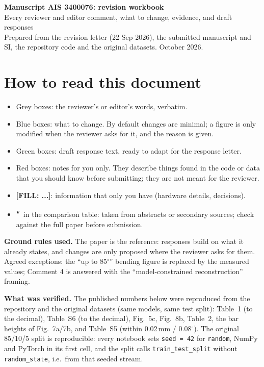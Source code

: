 \documentclass[10pt,a4paper]{article}
\newcommand{\FILL}[1]{\textcolor{orange!85!black}{\textbf{[FILL: #1]}}}
\newcommand{\vf}{\textsuperscript{\textcolor{orange!85!black}{\textbf{v}}}}
\begin{document}
\begin{center}
{\LARGE\bfseries Manuscript AIS 3400076: revision workbook}\\[4pt]
{\large Every reviewer and editor comment, what to change, evidence, and draft responses}\\[4pt]
{\small Prepared from the revision letter (22 Sep 2026), the submitted manuscript and SI, the repository code and the original datasets. October 2026.}
\end{center}

\section*{How to read this document}
\begin{itemize}
\item \colorbox{gray!15}{Grey boxes}: the reviewer's or editor's words, verbatim.
\item \colorbox{blue!8}{Blue boxes}: what to change. By default changes are minimal; a figure is only modified when the reviewer asks for it, and the reason is given.
\item \colorbox{green!8}{Green boxes}: draft response text, ready to adapt for the response letter.
\item \colorbox{red!8}{Red boxes}: notes for you only. They describe things found in the code or data that you should know before submitting; they are not meant for the reviewer.
\item \FILL{...}: information that only you have (hardware details, decisions).
\item \vf\ in the comparison table: taken from abstracts or secondary sources; check against the full paper before submission.
\end{itemize}
\textbf{Ground rules used.} The paper is the reference: responses build on what it already states, and changes are only proposed where the reviewer asks for them. Agreed exceptions: the ``up to 85$^\circ$'' bending figure is replaced by the measured values; Comment 4 is answered with the ``model-constrained reconstruction'' framing.

\textbf{What was verified.} The published numbers below were reproduced from the repository and the original datasets (same models, same test split): Table~1 (to the decimal), Table~S6 (to the decimal), Fig.~5c, Fig.~8b, Table~2, the bar heights of Fig.~7a/7b, and Table~S5 (within 0.02\,mm / 0.08$^\circ$). The original 85/10/5 split is reproducible: every notebook sets \texttt{seed = 42} for \texttt{random}, NumPy and PyTorch in its first cell, and the split calls \texttt{train\_test\_split} without \texttt{random\_state}, i.e.\ from that seeded stream.
\end{document}
